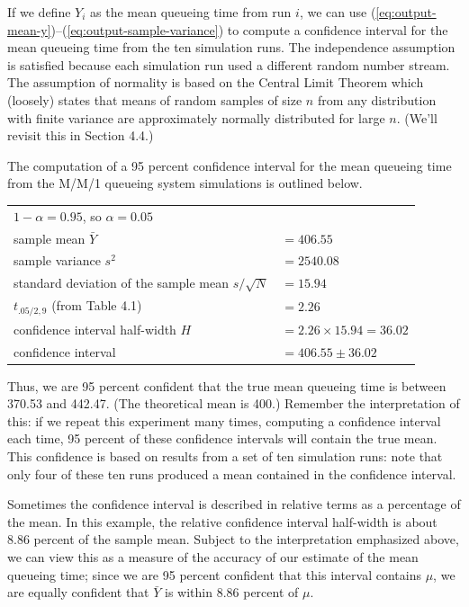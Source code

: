 If we define $Y_i$ as the mean queueing time from run $i$, we can use
(\ref{eq:output-mean-y})--(\ref{eq:output-sample-variance}) to compute a
confidence interval for the mean queueing time from the ten simulation runs.
The independence assumption is satisfied because each simulation run used a
different random number stream. The assumption of normality is based on the
Central Limit Theorem which (loosely) states that means of random samples of
size $n$ from any distribution with finite variance are approximately normally
distributed for large $n$. (We'll revisit this in Section 4.4.)

The computation of a 95 percent confidence interval for the mean queueing time
from the M/M/1 queueing system simulations is outlined below.

\begin{center}
\begin{tabular}{ll}
$1-\alpha = 0.95$, so $\alpha = 0.05$ & \\
sample mean $\bar{Y}$ & $= 406.55$ \\
sample variance $s^2$ & $= 2540.08$ \\
standard deviation of the sample mean $s/\sqrt{N}$ & $= 15.94$ \\
$t_{.05/2,9}$ (from Table 4.1) & $= 2.26$ \\
confidence interval half-width $H$ & $= 2.26 \times 15.94 = 36.02$ \\
confidence interval & $= 406.55 \pm 36.02$ \\
\end{tabular}
\end{center}

Thus, we are 95 percent confident that the true mean queueing time is between
370.53 and 442.47. (The theoretical mean is 400.) Remember the interpretation
of this: if we repeat this experiment many times, computing a confidence
interval each time, 95 percent of these confidence intervals will contain the
true mean. This confidence is based on results from a set of ten simulation
runs: note that only four of these ten runs produced a mean contained in the
confidence interval.

Sometimes the confidence interval is described in relative terms as a
percentage of the mean. In this example, the relative confidence interval
half-width is about 8.86 percent of the sample mean. Subject to the
interpretation emphasized above, we can view this as a measure of the
accuracy of our estimate of the mean queueing time; since we are 95 percent
confident that this interval contains $\mu$, we are equally confident that
$\bar{Y}$ is within 8.86 percent of $\mu$.

